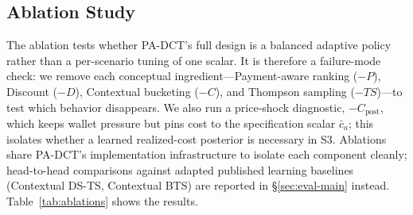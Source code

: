\subsection{Ablation Study}
\label{sec:eval-ablations}

The ablation tests whether PA-DCT's full design is a balanced adaptive policy rather than a per-scenario tuning of one scalar. It is therefore a failure-mode check: we remove each conceptual ingredient---Payment-aware ranking ($-P$), Discount ($-D$), Contextual bucketing ($-C$), and Thompson sampling ($-TS$)---to test which behavior disappears. We also run a price-shock diagnostic, $-C_{\mathrm{post}}$, which keeps wallet pressure but pins cost to the specification scalar $\bar c_a$; this isolates whether a learned realized-cost posterior is necessary in S3. Ablations share PA-DCT's implementation infrastructure to isolate each component cleanly; head-to-head comparisons against adapted published learning baselines (Contextual DS-TS, Contextual BTS) are reported in \S\ref{sec:eval-main} instead. Table~\ref{tab:ablations} shows the results.

